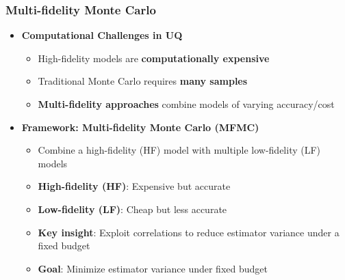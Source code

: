 \documentclass{beamer}
\begin{document}
\begin{frame}[t]
\frametitle{Multi-fidelity Monte Carlo}
\begin{itemize}[leftmargin=5pt] 

    \item[$\triangleright$] \textcolor{myblue3}{\bf Computational Challenges in UQ}
    \begin{itemize}[leftmargin=15pt] 
    \item[$\circ$] High-fidelity models are \textbf{computationally expensive}
    \item[$\circ$] Traditional Monte Carlo requires \textbf{many samples}
    \item[$\circ$] \textbf{Multi-fidelity approaches} combine models of varying accuracy/cost
    \end{itemize}
    
    \item[$\triangleright$] \textcolor{myblue3}{\bf Framework: Multi-fidelity Monte Carlo (MFMC)} 

    \begin{itemize}[leftmargin=15pt] 
    \item[$\circ$] Combine a high-fidelity (HF) model with multiple low-fidelity (LF) models
    \item[$\circ$] \textbf{High-fidelity (HF)}: Expensive but accurate
    \item[$\circ$] \textbf{Low-fidelity (LF)}: Cheap but less accurate
    \item[$\circ$] \textbf{Key insight}: Exploit correlations to reduce estimator variance under a fixed budget
    \item[$\circ$] \textbf{Goal}: Minimize estimator variance under fixed budget
    \end{itemize}   
    
    
\end{itemize}
\end{frame}
\end{document}
